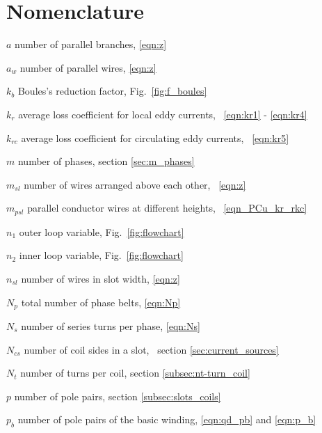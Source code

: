 \chapter{Nomenclature}

\begin{Nomencl}

   
   \item[$a$]              number of parallel branches, \eqref{eqn:z} 
   \item[$a_w$]            number of parallel wires, \eqref{eqn:z}
   
 	 \item[$k_b$]            Boules's reduction factor, Fig.~\ref{fig:f_boules}
	 \item[$k_r$]            average loss coefficient for local eddy currents,~%
	                         \eqref{eqn:kr1} - \eqref{eqn:kr4}
	 \item[$k_{rc}$]         average loss coefficient for circulating eddy currents,~%
	                         \eqref{eqn:kr5}  

	 \item[$m$]              number of phases, section \ref{sec:m_phases}	 
   \item[$m_{sl}$]         number of wires arranged above each other,~%
                           \eqref{eqn:z}  
   \item[$m_{psl}$]        parallel conductor wires at different heights,~%
                           \eqref{eqn_PCu_kr_rkc}
   
   \item[$n_1$]            outer loop variable, Fig.~\ref{fig:flowchart}
   \item[$n_2$]            inner loop variable, Fig.~\ref{fig:flowchart}
   \item[$n_{sl}$]         number of wires in slot width, \eqref{eqn:z} 
   \item[$N_p$]            total number of phase belts, \eqref{eqn:Np}
 	 \item[$N_s$]            number of series turns per phase, \eqref{eqn:Ns} 
	 \item[$N_{cs}$]         number of coil sides in a slot,~%
	                         section \ref{sec:current_sources}
	 \item[$N_{t}$]          number of turns per coil, section \ref{subsec:nt-turn_coil} 
	 	 
	 \item[$p$]              number of pole pairs, %
	                         section \ref{subsec:slots_coils} 
   \item[$p_{b}$]          number of pole pairs of the basic winding, %
                           \eqref{eqn:qd_pb} and \eqref{eqn:p_b}
   

\end{Nomencl}
